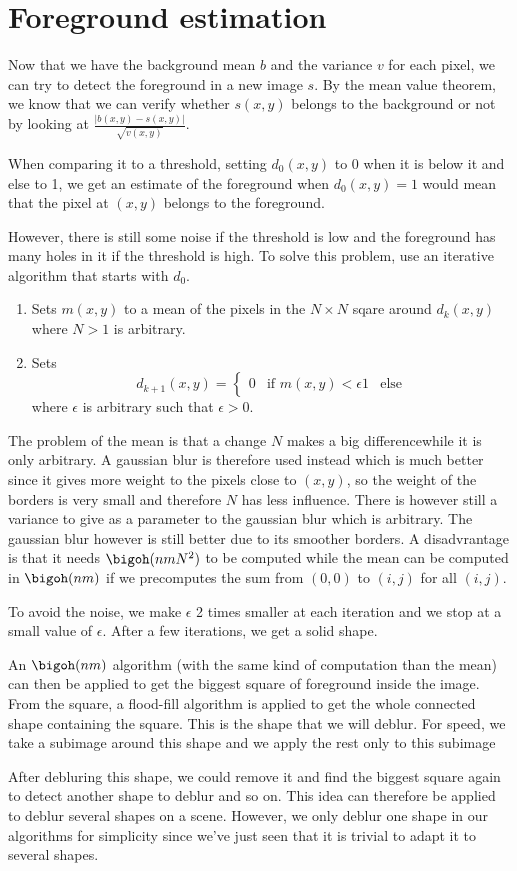 \section{Foreground estimation}
Now that we have the background mean $b$ and the variance $v$ for each
pixel, we can try to detect the foreground in a new image $s$.
By the mean value theorem, we know that we can
verify whether $s(x,y)$ belongs to the background or not
by looking at $\frac{|b(x,y) - s(x,y)|}{\sqrt{v(x,y)}}$.

When comparing it to a threshold, setting $d_0(x,y)$ to 0
when it is below it and else to 1, we
get an estimate of the foreground when $d_0(x,y) = 1$ would mean
that the pixel at $(x,y)$ belongs to the foreground.

However, there is still some noise if the threshold is low
and the foreground has many holes in it if the threshold is high.
To solve this problem, use an iterative algorithm that starts with $d_0$.
\begin{enumerate}
  \item Sets $m(x,y)$ to a mean of the pixels in the $N \times N$ sqare around $d_{k}(x,y)$ where $N > 1$ is arbitrary.
  \item Sets
    \[ d_{k+1}(x,y) =
      \begin{cases}
        0 & \text{if }m(x,y) < \epsilon
        1 & \text{else}
      \end{cases}
    \]
    where $\epsilon$ is arbitrary such that $\epsilon > 0$.
\end{enumerate}
The problem of the mean is that a change $N$ makes a big differencewhile it is only arbitrary.
A gaussian blur is therefore used instead which is much better since it gives more weight to the pixels close to $(x,y)$, so the weight of the borders is very small and therefore $N$ has less influence.
There is however still a variance to give as a parameter to the gaussian blur which is arbitrary.
The gaussian blur however is still better due to its smoother borders.
A disadvrantage is that it needs $\bigoh(nmN^2)$ to be computed while the mean can be computed in $\bigoh(nm)$ if we precomputes the sum from $(0,0)$ to $(i,j)$ for all $(i,j)$.

To avoid the noise, we make $\epsilon$ 2 times smaller at each iteration and we stop at a small value of $\epsilon$.
After a few iterations, we get a solid shape.

An $\bigoh(nm)$ algorithm (with the same kind of computation than the mean) can then be applied to get the biggest square of foreground inside the image.
From the square, a flood-fill algorithm is applied to get the whole connected shape containing the square.
This is the shape that we will deblur.
For speed, we take a subimage around this shape and we apply the rest only to this subimage

After debluring this shape, we could remove it and find the biggest square again to detect another shape to deblur and so on.
This idea can therefore be applied to deblur several shapes on a scene.
However, we only deblur one shape in our algorithms for simplicity
since we've just seen that it is trivial to adapt it to several shapes.
